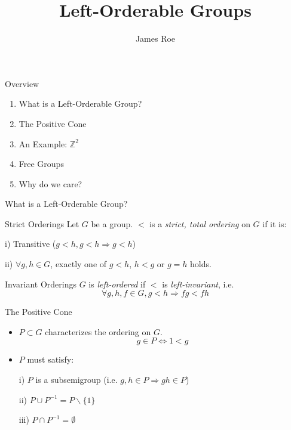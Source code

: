 \documentclass{beamer}
\title{Left-Orderable Groups}
\author{James Roe}
\begin{document}

\begin{frame}
	\maketitle %
\end{frame}


\begin{frame}{Overview}
	\begin{enumerate}
		\item What is a Left-Orderable Group?
		\item The Positive Cone
		\item An Example: $\mathbb{Z}^2$
		\item Free Groups
		\item Why do we care?
	\end{enumerate}
\end{frame}


\begin{frame}{What is a Left-Orderable Group?}
\begin{block}{Strict Orderings}
	Let $G$ be a group. $<$ is a \textit{strict, total ordering} on $G$ if it is:
	
	i) Transitive ($g<h, g<h \Rightarrow g<h$)
	
	ii) $\forall g,h \in G$, exactly one of $g<h$, $h<g$ or $g=h$ holds.  
\end{block}
\pause
\begin{block}{Invariant Orderings}
	$G$ is \textit{left-ordered} if $<$ is \textit{left-invariant}, i.e.
	\[
	\forall g,h,f \in G, g<h \Rightarrow fg<fh
	\]  
\end{block}
\end{frame}

\begin{frame}{The Positive Cone}
\begin{itemize}
	\item $P \subset G$ characterizes the ordering on $G$. 
	\[
	g \in P \iff 1<g
	\]
	\pause
	\item $P$ must satisfy:
	
	i) $P$ is a subsemigroup (i.e. $g,h \in P \Rightarrow gh \in P$) 
	
	ii) $P \cup P^{-1} = P \backslash \{1\}$
	
	iii) $P \cap P^{-1} = \emptyset$
\end{itemize}
\end{frame}
\end{document}
